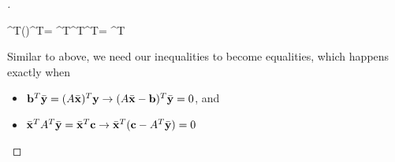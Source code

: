 \begin{proof}[] 
\begin{frml}
	\vb^T\by \leq (\vA\bx)^T\by = \bx^T\vA^T\by \leq \bx^T\vc = \vc^T\bx
\end{frml}
Similar to above, we need our inequalities to become equalities, which happens
exactly when
\begin{itemize}
	\item
		$\mathbf{b}^T\bar{\mathbf{y}} = (A\bar{\mathbf{x}})^T\mathbf{y} \rightarrow (A\bar{\mathbf{x}} - \mathbf{b})^T\bar{\mathbf{y}} = 0$, and
	\item
		$\bar{\mathbf{x}}^TA^T\bar{\mathbf{y}} = \bar{\mathbf{x}}^T\mathbf{c} \rightarrow \bar{\mathbf{x}}^T(\mathbf{c} - A^T\bar{\mathbf{y}}) = 0$
\end{itemize}
\end{proof}
